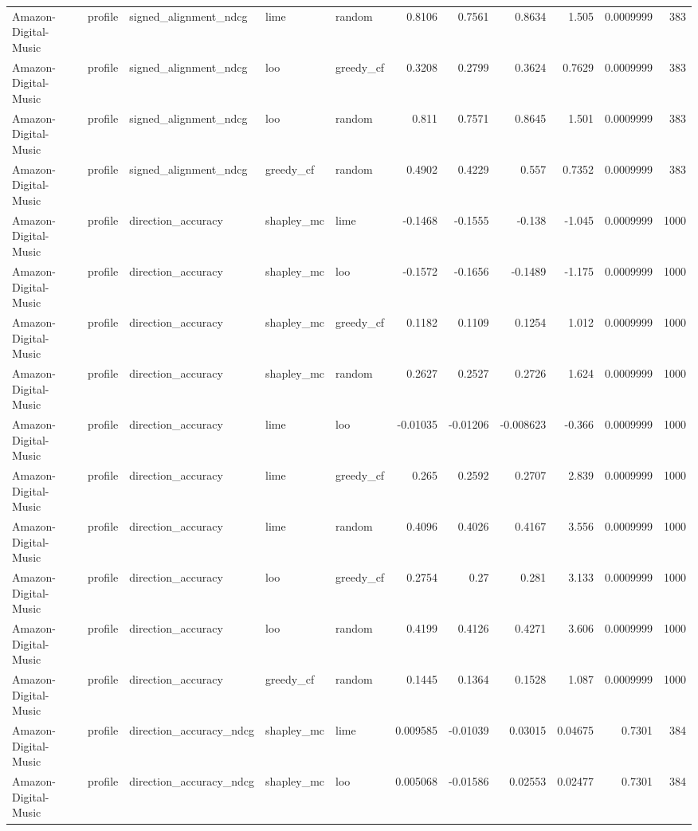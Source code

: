 \begin{table}[t]
\begin{tabular}{lllllrrrrrr}
Amazon-Digital-Music & profile & signed\_alignment\_ndcg & lime & random & 0.8106 & 0.7561 & 0.8634 & 1.505 & 0.0009999 & 383 \\
Amazon-Digital-Music & profile & signed\_alignment\_ndcg & loo & greedy\_cf & 0.3208 & 0.2799 & 0.3624 & 0.7629 & 0.0009999 & 383 \\
Amazon-Digital-Music & profile & signed\_alignment\_ndcg & loo & random & 0.811 & 0.7571 & 0.8645 & 1.501 & 0.0009999 & 383 \\
Amazon-Digital-Music & profile & signed\_alignment\_ndcg & greedy\_cf & random & 0.4902 & 0.4229 & 0.557 & 0.7352 & 0.0009999 & 383 \\
Amazon-Digital-Music & profile & direction\_accuracy & shapley\_mc & lime & -0.1468 & -0.1555 & -0.138 & -1.045 & 0.0009999 & 1000 \\
Amazon-Digital-Music & profile & direction\_accuracy & shapley\_mc & loo & -0.1572 & -0.1656 & -0.1489 & -1.175 & 0.0009999 & 1000 \\
Amazon-Digital-Music & profile & direction\_accuracy & shapley\_mc & greedy\_cf & 0.1182 & 0.1109 & 0.1254 & 1.012 & 0.0009999 & 1000 \\
Amazon-Digital-Music & profile & direction\_accuracy & shapley\_mc & random & 0.2627 & 0.2527 & 0.2726 & 1.624 & 0.0009999 & 1000 \\
Amazon-Digital-Music & profile & direction\_accuracy & lime & loo & -0.01035 & -0.01206 & -0.008623 & -0.366 & 0.0009999 & 1000 \\
Amazon-Digital-Music & profile & direction\_accuracy & lime & greedy\_cf & 0.265 & 0.2592 & 0.2707 & 2.839 & 0.0009999 & 1000 \\
Amazon-Digital-Music & profile & direction\_accuracy & lime & random & 0.4096 & 0.4026 & 0.4167 & 3.556 & 0.0009999 & 1000 \\
Amazon-Digital-Music & profile & direction\_accuracy & loo & greedy\_cf & 0.2754 & 0.27 & 0.281 & 3.133 & 0.0009999 & 1000 \\
Amazon-Digital-Music & profile & direction\_accuracy & loo & random & 0.4199 & 0.4126 & 0.4271 & 3.606 & 0.0009999 & 1000 \\
Amazon-Digital-Music & profile & direction\_accuracy & greedy\_cf & random & 0.1445 & 0.1364 & 0.1528 & 1.087 & 0.0009999 & 1000 \\
Amazon-Digital-Music & profile & direction\_accuracy\_ndcg & shapley\_mc & lime & 0.009585 & -0.01039 & 0.03015 & 0.04675 & 0.7301 & 384 \\
Amazon-Digital-Music & profile & direction\_accuracy\_ndcg & shapley\_mc & loo & 0.005068 & -0.01586 & 0.02553 & 0.02477 & 0.7301 & 384 \\

\end{tabular}
\end{table}
